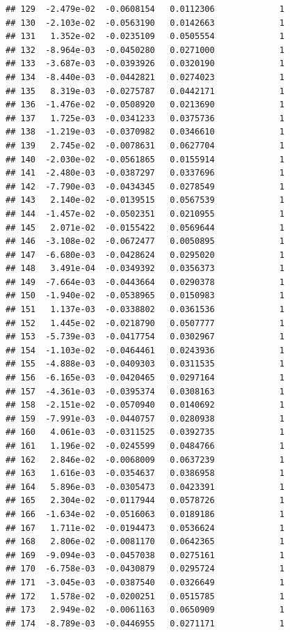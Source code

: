 \documentclass[12pt]{article}\usepackage[]{graphicx}\usepackage[]{xcolor}
\makeatletter
\newenvironment{kframe}{%
 \def\at@end@of@kframe{}%
 \ifinner\ifhmode%
  \def\at@end@of@kframe{\end{minipage}}%
  \begin{minipage}{\columnwidth}%
 \fi\fi%
 \def\FrameCommand##1{\hskip\@totalleftmargin \hskip-\fboxsep
 \colorbox{shadecolor}{##1}\hskip-\fboxsep
     \hskip-\linewidth \hskip-\@totalleftmargin \hskip\columnwidth}%
 \MakeFramed {\advance\hsize-\width
   \@totalleftmargin\z@ \linewidth\hsize
   \@setminipage}}%
 {\par\unskip\endMakeFramed%
 \at@end@of@kframe}
\newenvironment{knitrout}{}{} %
\makeatother
\begin{document}
\begin{knitrout}
\begin{kframe}
\begin{verbatim}
## 129  -2.479e-02  -0.0608154   0.0112306             1
## 130  -2.103e-02  -0.0563190   0.0142663             1
## 131   1.352e-02  -0.0235109   0.0505554             1
## 132  -8.964e-03  -0.0450280   0.0271000             1
## 133  -3.687e-03  -0.0393926   0.0320190             1
## 134  -8.440e-03  -0.0442821   0.0274023             1
## 135   8.319e-03  -0.0275787   0.0442171             1
## 136  -1.476e-02  -0.0508920   0.0213690             1
## 137   1.725e-03  -0.0341233   0.0375736             1
## 138  -1.219e-03  -0.0370982   0.0346610             1
## 139   2.745e-02  -0.0078631   0.0627704             1
## 140  -2.030e-02  -0.0561865   0.0155914             1
## 141  -2.480e-03  -0.0387297   0.0337696             1
## 142  -7.790e-03  -0.0434345   0.0278549             1
## 143   2.140e-02  -0.0139515   0.0567539             1
## 144  -1.457e-02  -0.0502351   0.0210955             1
## 145   2.071e-02  -0.0155422   0.0569644             1
## 146  -3.108e-02  -0.0672477   0.0050895             1
## 147  -6.680e-03  -0.0428624   0.0295020             1
## 148   3.491e-04  -0.0349392   0.0356373             1
## 149  -7.664e-03  -0.0443664   0.0290378             1
## 150  -1.940e-02  -0.0538965   0.0150983             1
## 151   1.137e-03  -0.0338802   0.0361536             1
## 152   1.445e-02  -0.0218790   0.0507777             1
## 153  -5.739e-03  -0.0417754   0.0302967             1
## 154  -1.103e-02  -0.0464461   0.0243936             1
## 155  -4.888e-03  -0.0409303   0.0311535             1
## 156  -6.165e-03  -0.0420465   0.0297164             1
## 157  -4.361e-03  -0.0395374   0.0308163             1
## 158  -2.151e-02  -0.0570940   0.0140692             1
## 159  -7.991e-03  -0.0440757   0.0280938             1
## 160   4.061e-03  -0.0311525   0.0392735             1
## 161   1.196e-02  -0.0245599   0.0484766             1
## 162   2.846e-02  -0.0068009   0.0637239             1
## 163   1.616e-03  -0.0354637   0.0386958             1
## 164   5.896e-03  -0.0305473   0.0423391             1
## 165   2.304e-02  -0.0117944   0.0578726             1
## 166  -1.634e-02  -0.0516063   0.0189186             1
## 167   1.711e-02  -0.0194473   0.0536624             1
## 168   2.806e-02  -0.0081170   0.0642365             1
## 169  -9.094e-03  -0.0457038   0.0275161             1
## 170  -6.758e-03  -0.0430879   0.0295724             1
## 171  -3.045e-03  -0.0387540   0.0326649             1
## 172   1.578e-02  -0.0200251   0.0515785             1
## 173   2.949e-02  -0.0061163   0.0650909             1
## 174  -8.789e-03  -0.0446955   0.0271171             1

\end{verbatim}
\end{kframe}
\end{knitrout}
\end{document}
